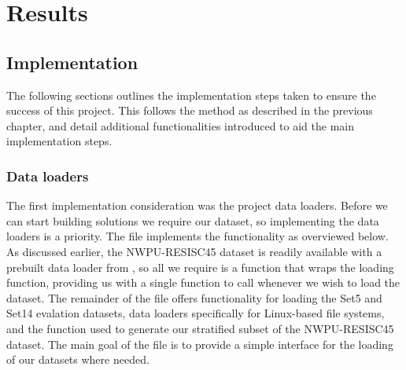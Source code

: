 \chapter{Results}
\label{chapter3}

\section{Implementation}
The following sections outlines the implementation steps taken to ensure the success of this project. This follows the method as described in the previous chapter, and detail additional functionalities introduced to aid the main implementation steps.

\subsection{Data loaders}
The first implementation consideration was the project data loaders. Before we can start building solutions we require our dataset, so implementing the data loaders is a priority. The  file implements the functionality as overviewed below. As discussed earlier, the NWPU-RESISC45 dataset is readily available with a prebuilt data loader from , so all we require is a function that wraps the  loading function, providing us with a single function to call whenever we wish to load the dataset. The remainder of the  file offers functionality for loading the Set5 and Set14 evalation datasets, data loaders specifically for Linux-based file systems, and the function used to generate our stratified subset of the NWPU-RESISC45 dataset. The main goal of the  file is to provide a simple interface for the loading of our datasets where needed.

